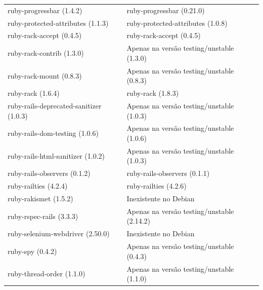 \begin{anexosenv}
\begin{longtable}[H]{l|l}
        ruby-progressbar (1.4.2)                         & ruby-progressbar (0.21.0)                                         \\
        ruby-protected-attributes (1.1.3)                & ruby-protected-attributes (1.0.8)                                  \\
        ruby-rack-accept (0.4.5)                         & ruby-rack-accept (0.4.5)                                  \\
        ruby-rack-contrib (1.3.0)                        & Apenas na versão testing/unstable (1.3.0)                                  \\
        ruby-rack-mount (0.8.3)                          & Apenas na versão testing/unstable (0.8.3)                                  \\
        ruby-rack (1.6.4)                                & ruby-rack (1.8.3)                                  \\
        ruby-rails-deprecated-sanitizer (1.0.3)          & Apenas na versão testing/unstable (1.0.3)                                  \\
        ruby-rails-dom-testing (1.0.6)                   & Apenas na versão testing/unstable (1.0.6)                                  \\
        ruby-rails-html-sanitizer (1.0.2)                & Apenas na versão testing/unstable (1.0.3)                                  \\
        ruby-rails-observers (0.1.2)                     & ruby-rails-observers (0.1.1)                                  \\
        ruby-railties (4.2.4)                            & ruby-railties (4.2.6)                                  \\
        ruby-rakismet (1.5.2)                            & Inexistente no Debian                                  \\
        ruby-rspec-rails (3.3.3)                         & Apenas na versão testing/unstable (2.14.2)                                  \\
        ruby-selenium-webdriver (2.50.0)                 & Inexistente no Debian                                  \\
        ruby-spy (0.4.2)                                 & Apenas na versão testing/unstable (0.4.3)                                  \\
        ruby-thread-order (1.1.0)                        & Apenas na versão testing/unstable (1.1.0)                                  \\

\end{longtable}
\end{anexosenv}

